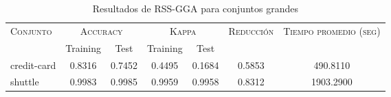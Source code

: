 \begin{table}[]
\centering
\begin{tabular}{l c c c c c c}
\hline
\multirow{2}{*}{\textsc{Conjunto}}
	& \multicolumn{2}{c}{\textsc{Accuracy}}
	& \multicolumn{2}{c}{\textsc{Kappa}}
	& \textsc{Reducción}
	& \textsc{Tiempo promedio (seg)} \\
	& Training & Test
	& Training & Test \\ 
\hline
\hline

credit-card & 0.8316 & 0.7452 & 0.4495 & 0.1684 & 0.5853 & 490.8110 \\
shuttle & 0.9983 & 0.9985 & 0.9959 & 0.9958 & 0.8312 & 1903.2900 \\

\hline
\end{tabular}
\caption{Resultados de RSS-GGA para conjuntos grandes }
\label{res-grande-rss-gga}
\end{table}

